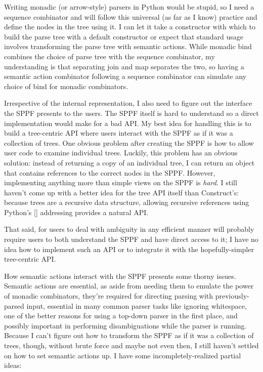 \documentclass[12pt]{article}
\begin{document}
Writing monadic (or arrow-style) parsers in Python would be stupid, so
I need a sequence combinator and will follow this universal (as far as
I know) practice and define the nodes in the tree using it.  I can let
it take a constructor with which to build the parse tree with a
default constructor or expect that standard usage involves
transforming the parse tree with semantic actions.  While monadic bind
combines the choice of parse tree with the sequence combinator, my
understanding is that separating join and map separates the two, so
having a semantic action combinator following a sequence combinator
can simulate any choice of bind for monadic combinators.

Irrespective of the internal representation, I also need to figure out
the interface the SPPF presents to the users.  The SPPF itself is hard
to understand so a direct implementation would make for a bad API.  My
best idea for handling this is to build a tree-centric API where users
interact with the SPPF as if it was a collection of trees.  One
obvious problem after creating the SPPF is how to allow user code to
examine individual trees.  Luckily, this problem has an obvious
solution: instead of returning a copy of an individual tree, I can
return an object that contains references to the correct nodes in the
SPPF.  However, implementing anything more than simple views on the
SPPF is \emph{hard}.  I still haven't come up with a better idea for
the tree API itself than Construct's: because trees are a recursive
data structure, allowing recursive references using Python's []
addressing provides a natural API.

That said, for users to deal with ambiguity in any efficient manner
will probably require users to both understand the SPPF and have
direct access to it; I have no idea how to implement such an API or to
integrate it with the hopefully-simpler tree-centric API.

How semantic actions interact with the SPPF presents some thorny
issues.  Semantic actions are essential, as aside from needing them to
emulate the power of monadic combinators, they're required for
directing parsing with previously-parsed input, essential in many
common parser tasks like ignoring whitespace, one of the better reasons
for using a top-down parser in the first place, and possibly important
in performing disambiguations while the parser is running.  Because
I can't figure out how to transform the SPPF as if it was a collection
of trees, though, without brute force and maybe not even then, I still
haven't settled on how to set semantic actions up.  I have some
incompletely-realized partial ideas:
\end{document}
